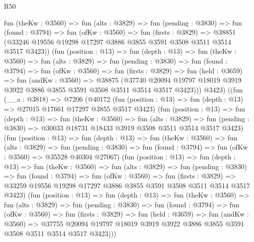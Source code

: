 \begin{lexlean}{R50}
\begin{coremodule}
          fun (theKw : @3560) =>
          fun (alts : @3829) =>
          fun (pending : @3830) =>
          fun (found : @3794) =>
          fun (ofKw : @3560) =>
          fun (firsts : @3829) =>
          @38851 (@33246 @19556 @19298 @17297 @3886 @3855 @3591 @3508 @3511 @3514 @3517 @3423))
          (fun (position : @13) =>
          fun (depth : @13) =>
          fun (theKw : @3560) =>
          fun (alts : @3829) =>
          fun (pending : @3830) =>
          fun (found : @3794) =>
          fun (ofKw : @3560) =>
          fun (firsts : @3829) =>
          fun (held : @3659) =>
          fun (andKw : @3560) =>
          @38875
            (@37740
              @20094
              @19797
              @18019
              @3919
              @3922
              @3886
              @3855
              @3591
              @3508
              @3511
              @3514
              @3517
              @3423)))
          @3423)
        ((fun (__a : @3818) =>
        @7206
          (@40172
            (fun (position : @13) => fun (depth : @13) => @27015 @17661 @17297 @3855 @3517 @3423)
            (fun (position : @13) =>
            fun (depth : @13) =>
            fun (theKw : @3560) =>
            fun (alts : @3829) =>
            fun (pending : @3830) => @30033 @18731 @18433 @3919 @3508 @3511 @3514 @3517 @3423)
            (fun (position : @13) =>
            fun (depth : @13) =>
            fun (theKw : @3560) =>
            fun (alts : @3829) =>
            fun (pending : @3830) =>
            fun (found : @3794) => fun (ofKw : @3560) => @35528 @40304 @27067)
            (fun (position : @13) =>
            fun (depth : @13) =>
            fun (theKw : @3560) =>
            fun (alts : @3829) =>
            fun (pending : @3830) =>
            fun (found : @3794) =>
            fun (ofKw : @3560) =>
            fun (firsts : @3829) =>
            @33259 @19556 @19298 @17297 @3886 @3855 @3591 @3508 @3511 @3514 @3517 @3423)
            (fun (position : @13) =>
            fun (depth : @13) =>
            fun (theKw : @3560) =>
            fun (alts : @3829) =>
            fun (pending : @3830) =>
            fun (found : @3794) =>
            fun (ofKw : @3560) =>
            fun (firsts : @3829) =>
            fun (held : @3659) =>
            fun (andKw : @3560) =>
            @37755
              @20094
              @19797
              @18019
              @3919
              @3922
              @3886
              @3855
              @3591
              @3508
              @3511
              @3514
              @3517
              @3423)))

\end{coremodule}
\end{lexlean}
